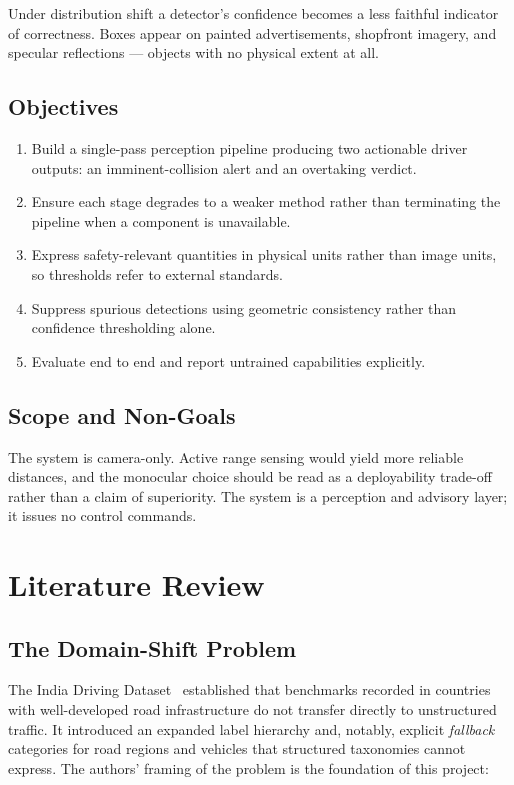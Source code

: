 \documentclass[11pt,a4paper]{report}
\begin{document}
Under distribution shift a detector's confidence becomes a less faithful
indicator of correctness. Boxes appear on painted advertisements, shopfront
imagery, and specular reflections — objects with no physical extent at all.

\section{Objectives}

\begin{enumerate}[leftmargin=1.6em,itemsep=2pt]
  \item Build a single-pass perception pipeline producing two actionable driver
        outputs: an imminent-collision alert and an overtaking verdict.
  \item Ensure each stage degrades to a weaker method rather than terminating
        the pipeline when a component is unavailable.
  \item Express safety-relevant quantities in physical units rather than image
        units, so thresholds refer to external standards.
  \item Suppress spurious detections using geometric consistency rather than
        confidence thresholding alone.
  \item Evaluate end to end and report untrained capabilities explicitly.
\end{enumerate}

\section{Scope and Non-Goals}

The system is camera-only. Active range sensing would yield more reliable
distances, and the monocular choice should be read as a deployability
trade-off rather than a claim of superiority. The system is a perception and
advisory layer; it issues no control commands.

\chapter{Literature Review}

\section{The Domain-Shift Problem}

The India Driving Dataset~\cite{varma2019idd} established that benchmarks
recorded in countries with well-developed road infrastructure do not transfer
directly to unstructured traffic. It introduced an expanded label hierarchy and,
notably, explicit \textit{fallback} categories for road regions and vehicles
that structured taxonomies cannot express. The authors' framing of the problem
is the foundation of this project:
\end{document}
